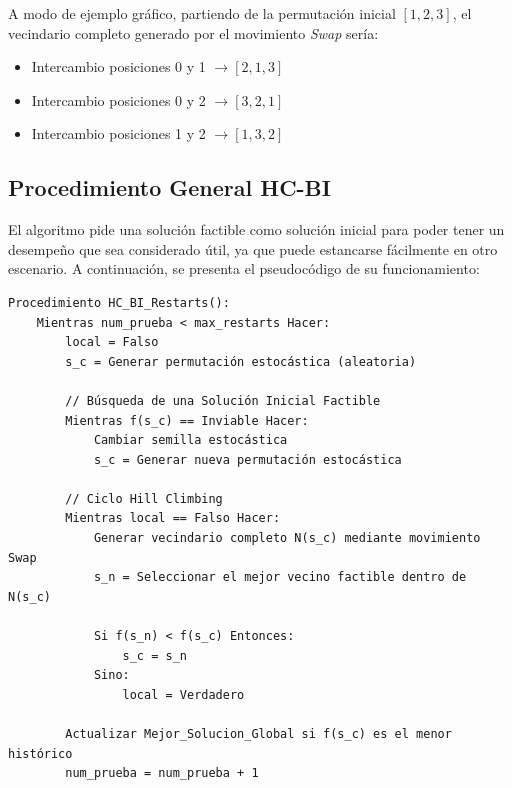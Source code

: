 \documentclass[letter, 10pt]{article}
\begin{document}
A modo de ejemplo gráfico, partiendo de la permutación inicial $[1, 2, 3]$, el vecindario completo generado por el movimiento \textit{Swap} sería:
\begin{itemize}
    \item Intercambio posiciones 0 y 1 $\rightarrow [2, 1, 3]$
    \item Intercambio posiciones 0 y 2 $\rightarrow [3, 2, 1]$
    \item Intercambio posiciones 1 y 2 $\rightarrow [1, 3, 2]$
\end{itemize}

\subsection{Procedimiento General HC-BI}
El algoritmo pide una solución factible como solución inicial para poder tener un desempeño que sea considerado útil, ya que puede estancarse fácilmente en otro escenario. A continuación, se presenta el pseudocódigo de su funcionamiento:

\begin{verbatim}
Procedimiento HC_BI_Restarts():
    Mientras num_prueba < max_restarts Hacer:
        local = Falso
        s_c = Generar permutación estocástica (aleatoria)
        
        // Búsqueda de una Solución Inicial Factible
        Mientras f(s_c) == Inviable Hacer:
            Cambiar semilla estocástica
            s_c = Generar nueva permutación estocástica
        
        // Ciclo Hill Climbing
        Mientras local == Falso Hacer:
            Generar vecindario completo N(s_c) mediante movimiento Swap
            s_n = Seleccionar el mejor vecino factible dentro de N(s_c)
            
            Si f(s_n) < f(s_c) Entonces:
                s_c = s_n
            Sino:
                local = Verdadero
        
        Actualizar Mejor_Solucion_Global si f(s_c) es el menor histórico
        num_prueba = num_prueba + 1
\end{verbatim}
\end{document}
